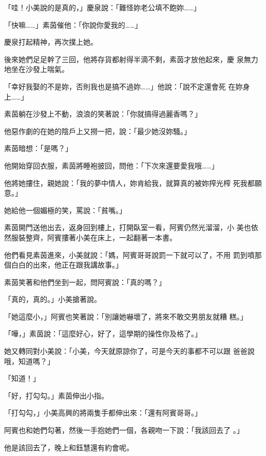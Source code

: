 「哇！小美說的是真的，」慶泉說：「難怪妳老公填不飽妳……」

「快嘛……」素茵催他：「你說你愛我的……」

慶泉打起精神，再次撲上她。

後來她們足足幹了三回，他將存貨都射得半滴不剩，素茵才放他起來，慶
泉無力地坐在沙發上喘氣。

「幸好我娶的不是妳，否則我也是搞不過妳……」他說：「說不定還會死
在妳身上……」

素茵躺在沙發上不動，浪浪的笑著說：「你就搞得過麗香嗎？」

他惡作劇的在她的陰戶上又撈一把，說：「最少她沒妳騷。」

素茵暗想：「是嗎？」

他開始穿回衣服，素茵將睡袍披回，問他：「下次來還要愛我哦……」

他將她摟住，親她說：「我的夢中情人，妳肯給我，就算真的被妳搾光榨
死我都願意。」

她給他一個媚極的笑，罵說：「貧嘴。」

素茵開門送他出去，返身回到樓上，打開臥室一看，阿賓仍然光溜溜，小
美也依然服裝整齊，阿賓摟著小美在床上，一起翻著一本書。

他們看見素茵進來，小美就說：「媽，阿賓哥哥說罰一下就可以了，不用
罰到噴那個白白的出來，他正在跟我講故事。」

素茵笑著和他們坐到一起，問阿賓說：「真的嗎？」

「真的，真的。」小美搶著說。

「她這麼小，」阿賓也笑著說：「別讓她嚇壞了，將來不敢交男朋友就糟
糕。」

「嘩，」素茵說：「這麼好心，好了，這學期的操性你及格了。」

她又轉同對小美說：「小美，今天就原諒你了，可是今天的事都不可以跟
爸爸說哦，知道嗎？」

「知道！」

「好，打勾勾。」素茵伸出小指。

「打勾勾，」小美高興的將兩隻手都伸出來：「還有阿賓哥哥。」

阿賓也和她們勾著，然後一手抱她們一個，各親吻一下說：「我該回去了
。」

他是該回去了，晚上和鈺慧還有約會呢。










